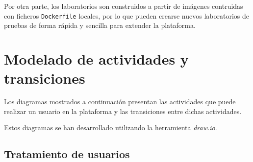             Por otra parte, los laboratorios son construidos a partir de imágenes contruidas con ficheros \texttt{Dockerfile} locales, por lo que pueden crearse nuevos laboratorios de pruebas de forma rápida y sencilla para extender la plataforma.
            
            \newpage
    
    \section{Modelado de actividades y transiciones}
        \label{sec:modelado-actividades-transiciones}

        Los diagramas mostrados a continuación presentan las actividades que puede realizar un usuario en la plataforma y las transiciones entre dichas actividades.
        
        Estos diagramas se han desarrollado utilizando la herramienta \textit{draw.io}.
        
        \subsection{Tratamiento de usuarios}
        
